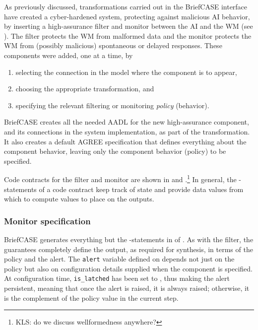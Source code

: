 As previously discussed, transformations carried out in the BriefCASE
interface have created a cyber-hardened system, protecting against
malicious AI behavior, by inserting a high-assurance filter and
monitor between the AI and the WM (see ). The
filter protects the WM from malformed data and the monitor protects
the WM from (possibly malicious) spontaneous or delayed responses.
These components were added, one at a time, by
\begin{enumerate}
  \item selecting the connection in the model where the
    component is to appear,
  \item choosing the appropriate transformation, and
  \item specifying the relevant filtering or monitoring \emph{policy} (behavior).
\end{enumerate}


BriefCASE creates all the needed AADL for the new high-assurance
component, and its connections in the system implementation, as part
of the transformation.  It also creates a default AGREE specification
that defines everything about the component behavior, leaving only the
component behavior (policy) to be specified.


Code contracts for the filter and monitor are shown in
 and .\footnote{KLS: do we discuss wellformedness anywhere?} In general, the
-statements of a code contract keep track of
state and provide data values from which to compute values to place on
the outputs.

\subsubsection{Monitor specification}
BriefCASE generates everything but the
-statements in  of
.  As with the filter, the guarantees
completely define the output, as required for synthesis, in terms of
the policy and the alert.  The
\texttt{alert} variable defined on  depends
not just on the policy but also on configuration details supplied when
the component is specified.  At configuration
time, \texttt{is\_latched} has been set to , thus making
the alert persistent, meaning that once the alert is raised, it is
always raised; otherwise, it is the complement of the policy value in
the current step.

